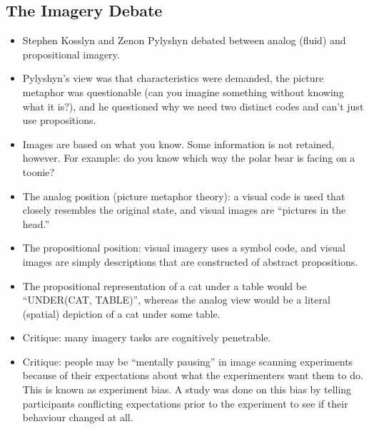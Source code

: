 \documentclass[]{article}
\begin{document}
		\subsection{The Imagery Debate}
			\begin{itemize}
				\item Stephen Kosslyn and Zenon Pylyshyn debated between analog (fluid) and propositional imagery.
				\item Pylyshyn's view was that characteristics were demanded, the picture metaphor was questionable (can you imagine something without knowing what it is?), and he questioned why we need two distinct codes and can't just use propositions.
				\item Images are based on what you know. Some information is not retained, however. For example: do you know which way the polar bear is facing on a toonie?
				\item The analog position (picture metaphor theory): a visual code is used that closely resembles the original state, and visual images are ``pictures in the head.''
				\item The propositional position: visual imagery uses a symbol code, and visual images are simply descriptions that are constructed of abstract propositions.
				\item The propositional representation of a cat under a table would be ``UNDER(CAT, TABLE)'', whereas the analog view would be a literal (spatial) depiction of a cat under some table.
				\item Critique: many imagery tasks are cognitively penetrable.
				\item Critique: people may be ``mentally pausing'' in image scanning experiments because of their expectations about what the experimenters want them to do. This is known as experiment bias. A study was done on this bias by telling participants conflicting expectations prior to the experiment to see if their behaviour changed at all.
			\end{itemize}
\end{document}
